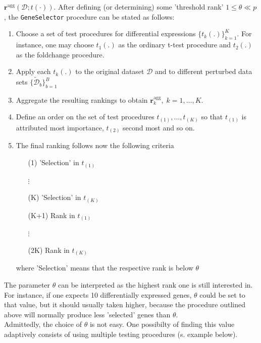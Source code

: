 $\bm{r}^{\text{agg}}(\mathcal{D}; t(\cdot))$.
After defining (or determining) some \hypertarget{thres}{'threshold rank'}
$1 \leq \theta \ll p$, the
\hypertarget{gk}{\texttt{GeneSelector}} procedure can be stated as follows:
\begin{enumerate}
\item Choose a set of test procedures for differential expressions
      $\{ t_k(.) \}_{k=1}^K$. For instance, one may choose $t_1(.)$ as the
ordinary t-test procedure and $t_2(.)$ as the foldchange procedure.
\item Apply each $t_k(.)$ to the original dataset $\mathcal{D}$ and to
      different perturbed data sets $\{ \widetilde{\mathcal{D}}_b \}_{b=1}^B$
\item Aggregate the resulting rankings to obtain
      $\bm{r}_k^{\text{agg}}, \; k=1,\ldots,K$.
\item Define an \hypertarget{orderstat}{order} on the set of test procedures
      $t_{(1)},\ldots,t_{(K)}$ so that $t_{(1)}$ is attributed
      most importance, $t_{(2)}$ second most and so on.
\item The final ranking follows now the following criteria
      \begin{itemize}
      \item[(1)] 'Selection' in $t_{(1)}$
      \item[$\vdots$]
      \item[(K)]  'Selection' in $t_{(K)}$
      \item[(K+1)] Rank in $t_{(1)}$
      \item[$\vdots$]
      \item[(2K)]  Rank in $t_{(K)}$
      \end{itemize}
      where 'Selection' means that the respective rank is below $\theta$
\end{enumerate}
The parameter $\theta$ can be interpreted as the highest rank one is
still interested in. For instance, if one expects 10 differentially
expressed genes, $\theta$ could be set to that value, but it should
usually taken higher, because the procedure outlined above will normally produce
less 'selected' genes than $\theta$.\\
Admittedly, the choice of $\theta$ is not easy. One possibilty of
finding this value adaptively consists of using multiple testing procedures
(s. example below).

